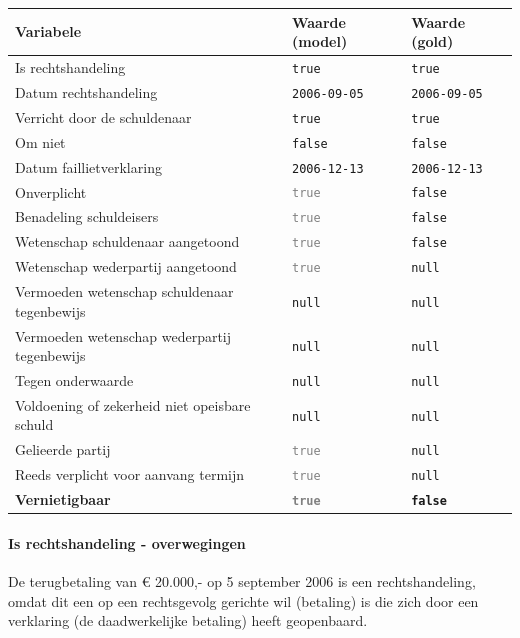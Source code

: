 \documentclass[
  dutch,
  a4paper,
]{article}
\begin{document}
\begin{center}
\small
\begin{tabular}{@{}p{7.4cm}p{2.6cm}p{2.6cm}@{}}
\toprule
Variabele & Waarde (model) & Waarde (gold) \\
\midrule
Is rechtshandeling & \texttt{true} & \texttt{true} \\
Datum rechtshandeling & \texttt{2006-09-05} & \texttt{2006-09-05} \\
Verricht door de schuldenaar & \texttt{true} & \texttt{true} \\
Om niet & \texttt{false} & \texttt{false} \\
Datum faillietverklaring & \texttt{2006-12-13} & \texttt{2006-12-13} \\
Onverplicht & \textcolor{gray}{\texttt{true}} & \texttt{false} \\
Benadeling schuldeisers & \textcolor{gray}{\texttt{true}} & \texttt{false} \\
Wetenschap schuldenaar aangetoond & \textcolor{gray}{\texttt{true}} & \texttt{false} \\
Wetenschap wederpartij aangetoond & \textcolor{gray}{\texttt{true}} & \texttt{null} \\
Vermoeden wetenschap schuldenaar tegenbewijs & \texttt{null} & \texttt{null} \\
Vermoeden wetenschap wederpartij tegenbewijs & \texttt{null} & \texttt{null} \\
Tegen onderwaarde & \texttt{null} & \texttt{null} \\
Voldoening of zekerheid niet opeisbare schuld & \texttt{null} & \texttt{null} \\
Gelieerde partij & \textcolor{gray}{\texttt{true}} & \texttt{null} \\
Reeds verplicht voor aanvang termijn & \textcolor{gray}{\texttt{true}} & \texttt{null} \\
\textbf{Vernietigbaar} & \textbf{\textcolor{gray}{\texttt{true}}} & \textbf{\texttt{false}} \\
\bottomrule
\end{tabular}
\end{center}

\paragraph{Is rechtshandeling - overwegingen}\label{is-rechtshandeling---overwegingen-72}

De terugbetaling van € 20.000,- op 5 september 2006 is een rechtshandeling, omdat dit een op een rechtsgevolg gerichte wil (betaling) is die zich door een verklaring (de daadwerkelijke betaling) heeft geopenbaard.
\end{document}
